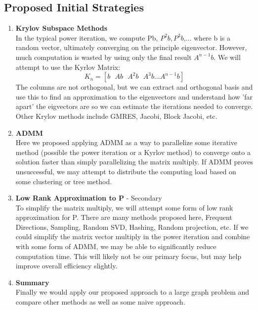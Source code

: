 \documentclass[a4paper,10pt]{article}
\begin{document}
\subsection{Proposed Initial Strategies}
\begin{enumerate}
\item \textbf{Krylov Subspace Methods} \\
In the typical power iteration, we compute Pb, $P^{2}b, P^{3}b$,... where b is a random vector, ultimately converging on the principle eigenvector. However, much computation is wasted by using only the final result $A^{n-1}b$. We will attempt to use the Kyrlov Matrix:
\begin{equation}
 K_{n} = [b \: \: \: Ab \: \: \:A^{2}b \: \: \:A^{3}b ... A^{n-1}b ]
\end{equation}
The columns are not orthogonal, but we can extract and orthogonal basis and use this to find an approximation to the eigenvectors and understand how 'far apart' the eigvectors are so we can estimate the iterations needed to converge. Other Krylov methods include GMRES, Jacobi, Block Jacobi, etc.

\item \textbf{ADMM} \\
Here we proposed applying ADMM as a way to parallelize some iterative method (possible the power iteration or a Kyrlov method) to converge onto a solution faster than simply parallelizing the matrix multiply. If ADMM proves unsuccessful, we may attempt to distribute the computing load based on some clustering or tree method.
\item \textbf{Low Rank Approximation to P} - Secondary \\
To simplify the matrix multiply, we will attempt some form of low rank approximation for P. There are many methods proposed here, Frequent Directions, Sampling, Random SVD, Hashing, Random projection, etc. If we could simplify the matrix vector multiply in the power iteration and combine with some form of ADMM, we may be able to significantly reduce computation time. This will likely not be our primary focus, but may help improve overall efficiency slightly. 
\item \textbf{Summary} \\
Finally we would apply our proposed approach to a large graph problem and compare other methods as well as some naive approach.

\end{enumerate}
\end{document}
